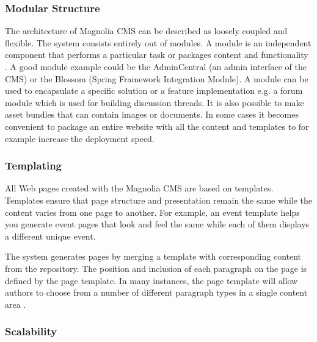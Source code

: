 \subsubsection{Modular Structure}
The architecture of Magnolia CMS can be described as loosely coupled and
flexible. The system consists entirely out of modules.  A module is an
independent component that performs a particular task or packages content and
functionality \cite{book_of_magnolia}.
A good module example could be the AdminCentral (an admin interface of the CMS)
or the Blossom (Spring Framework Integration Module). A module can be used to
encapsulate a specific solution or a feature implementation e.g. a forum module
which is used for building discussion threads. It is also possible to make asset
bundles that can contain images or documents.
In some cases it becomes convenient to package an entire website with all the
content and templates to for example increase the deployment speed.

\subsubsection{Templating}
All Web pages created with the Magnolia CMS are based on templates. Templates
ensure that page structure and presentation remain the same while the content
varies from one page to another. For example, an event template helps you
generate event pages that look and feel the same while each of them displays a
different unique event.

The system generates pages by merging a template with corresponding content from
the repository. The position and inclusion of each paragraph on the page is
defined by the page template. In many instances, the page template will allow
authors to choose from a number of different paragraph types in a single content
area \cite{book_of_magnolia}.

\subsubsection{Scalability}

